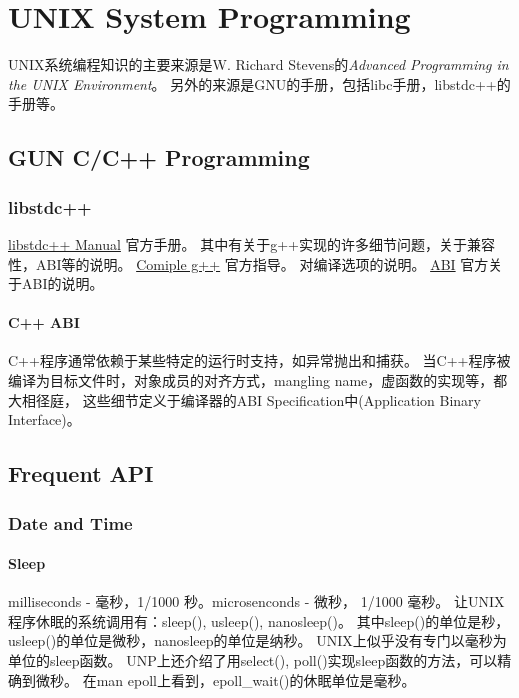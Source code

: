 \part{UNIX System Programming}

UNIX系统编程知识的主要来源是W. Richard Stevens的\emph{Advanced Programming in the UNIX Environment}。
另外的来源是GNU的手册，包括libc手册，libstdc++的手册等。

\chapter{GUN C/C++ Programming}
\section{libstdc++}
\noindent\href{http://gcc.gnu.org/onlinedocs/libstdc++/manual/spine.html}{libstdc++ Manual} 官方手册。
其中有关于g++实现的许多细节问题，关于兼容性，ABI等的说明。
\noindent\href{http://gcc.gnu.org/onlinedocs/libstdc++/manual/configure.html}{Comiple g++} 官方指导。
对编译选项的说明。
\noindent\href{http://gcc.gnu.org/onlinedocs/libstdc++/manual/abi.html}{ABI} 官方关于ABI的说明。

\subsection{C++ ABI}
C++程序通常依赖于某些特定的运行时支持，如异常抛出和捕获。
当C++程序被编译为目标文件时，对象成员的对齐方式，mangling name，虚函数的实现等，都大相径庭，
这些细节定义于编译器的ABI Specification中(Application Binary Interface)。

\chapter{Frequent API}
\section{Date and Time}
\subsection{Sleep}
milliseconds - 毫秒，1/1000 秒。microsenconds - 微秒， 1/1000 毫秒。
让UNIX程序休眠的系统调用有：sleep(), usleep(), nanosleep()。
其中sleep()的单位是秒，usleep()的单位是微秒，nanosleep的单位是纳秒。
UNIX上似乎没有专门以毫秒为单位的sleep函数。
UNP上还介绍了用select(), poll()实现sleep函数的方法，可以精确到微秒。
在man epoll上看到，epoll\_wait()的休眠单位是毫秒。

